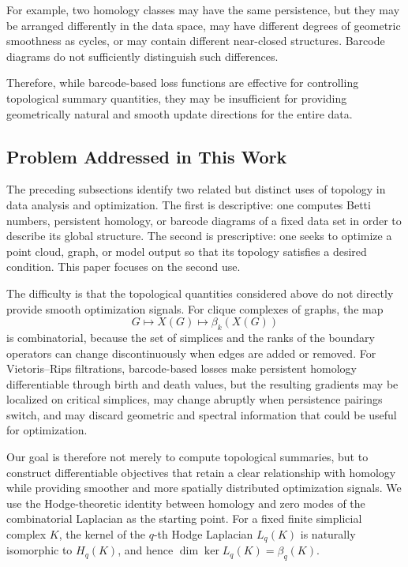 \documentclass[pdflatex,sn-mathphys-ay]{sn-jnl}%
\theoremstyle{thmstyleone}%
\theoremstyle{thmstyletwo}%
\theoremstyle{thmstylethree}%
\begin{document}
For example, two homology classes may have the same persistence, but they may be arranged differently in the data space, may have different degrees of geometric smoothness as cycles, or may contain different near-closed structures.
Barcode diagrams do not sufficiently distinguish such differences.

Therefore, while barcode-based loss functions are effective for controlling topological summary quantities, they may be insufficient for providing geometrically natural and smooth update directions for the entire data.

\subsection[Problem Addressed in This Work]{Problem Addressed in This Work}

The preceding subsections identify two related but distinct uses of topology in data analysis and optimization. The first is descriptive: one computes Betti numbers, persistent homology, or barcode diagrams of a fixed data set in order to describe its global structure. The second is prescriptive: one seeks to optimize a point cloud, graph, or model output so that its topology satisfies a desired condition. This paper focuses on the second use.

The difficulty is that the topological quantities considered above do not directly provide smooth optimization signals. For clique complexes of graphs, the map
\[
G
\longmapsto
X(G)
\longmapsto
\beta_k(X(G))
\]
is combinatorial, because the set of simplices and the ranks of the boundary operators can change discontinuously when edges are added or removed. For Vietoris--Rips filtrations, barcode-based losses make persistent homology differentiable through birth and death values, but the resulting gradients may be localized on critical simplices, may change abruptly when persistence pairings switch, and may discard geometric and spectral information that could be useful for optimization.

Our goal is therefore not merely to compute topological summaries, but to construct differentiable objectives that retain a clear relationship with homology while providing smoother and more spatially distributed optimization signals. We use the Hodge-theoretic identity between homology and zero modes of the combinatorial Laplacian as the starting point. For a fixed finite simplicial complex \(K\), the kernel of the \(q\)-th Hodge Laplacian \(L_q(K)\) is naturally isomorphic to \(H_q(K)\), and hence \(\dim\ker L_q(K)=\beta_q(K)\).
\end{document}
